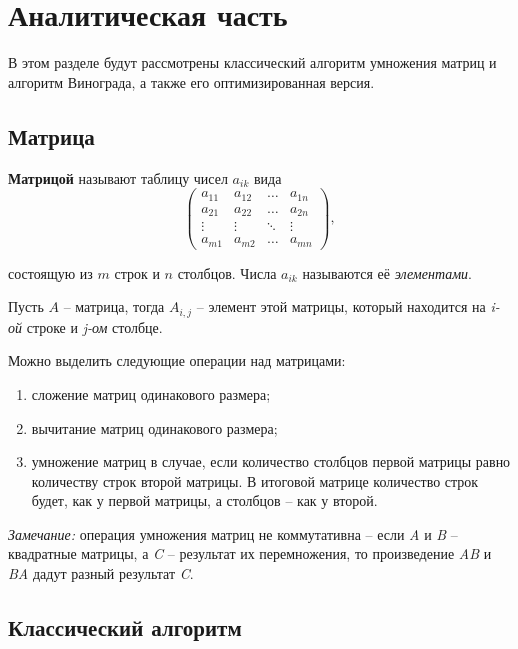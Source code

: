\chapter{Аналитическая часть}

В этом разделе будут рассмотрены классический алгоритм умножения матриц и алгоритм Винограда, а также его оптимизированная версия.

\section{Матрица}

\textbf{Матрицой} \cite{book_matrix} называют таблицу чисел $a_{ik}$ вида
\begin{equation}
	\begin{pmatrix}
		a_{11} & a_{12} & \ldots & a_{1n}\\
		a_{21} & a_{22} & \ldots & a_{2n}\\
		\vdots & \vdots & \ddots & \vdots\\
		a_{m1} & a_{m2} & \ldots & a_{mn}
	\end{pmatrix},
\end{equation}

состоящую из $m$ строк и $n$ столбцов. Числа $a_{ik}$ называются её \textit{элементами}.

Пусть $A$ -- матрица, тогда $A_{i,j}$ -- элемент этой матрицы, который находится на \textit{i-ой} строке и \textit{j-ом} столбце.

Можно выделить следующие операции над матрицами:
\begin{enumerate}[label=\arabic*)]
	\item сложение матриц одинакового размера;
	\item вычитание матриц одинакового размера;
	\item умножение матриц в случае, если количество столбцов первой матрицы равно количеству строк второй матрицы. В итоговой матрице количество строк будет, как у первой матрицы, а столбцов -- как у второй. \newline
\end{enumerate}

\textit{Замечание:} операция умножения матриц не коммутативна -- если \textit{A} и \textit{B} -- квадратные матрицы, а \textit{C} -- результат их перемножения, то произведение \textit{AB} и \textit{BA} дадут разный результат \textit{C}.

\section{Классический алгоритм}

